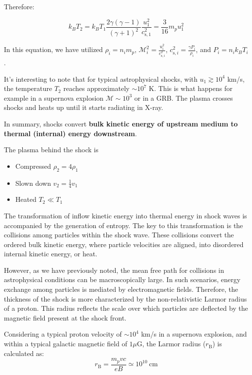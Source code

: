 Therefore:
%
\begin{remark}
\begin{equation}
k_B T_2 = k_B T_1 \frac{2 \gamma (\gamma - 1)}{(\gamma +1)^2} \frac{u_1^2}{c_{\text{s},1}^2} = \frac{3}{16} m_p u_1^2
\end{equation}
\end{remark}

In this equation, we have utilized \( \rho_i = n_i m_p \), \( \mathcal{M}_i^2 = \frac{u_i^2}{c_{\text{s},i}^2} \), \( c_{\text{s},i}^2 = \frac{\gamma P_i}{\rho_i} \), and \( P_i = n_i k_B T_i \).

It's interesting to note that for typical astrophysical shocks, with \( u_1 \gtrsim 10^4 \) km/s, the temperature \( T_2 \) reaches approximately \( \sim 10^7 \) K.
%
This is what happens for example in a supernova explosion \( \mathcal M \sim 10^3 \) or in a GRB.  The plasma crosses shocks and heats up until it starts radiating in X-ray.

In summary, shocks convert \textbf{bulk kinetic energy of upstream medium to thermal (internal) energy downstream}.

\begin{remark}
The plasma behind the shock is
\begin{itemize}
\item Compressed \( \rho_2 = 4 \rho_1 \)
\item Slown down \( v_2 = \frac{1}{4} v_1 \)
\item Heated \( T_2 \ll T_1 \)
\end{itemize}
\end{remark}

The transformation of inflow kinetic energy into thermal energy in shock waves is accompanied by the generation of entropy. The key to this transformation is the collisions among particles within the shock wave. These collisions convert the ordered bulk kinetic energy, where particle velocities are aligned, into disordered internal kinetic energy, or heat.

However, as we have previously noted, the mean free path for collisions in astrophysical conditions can be macroscopically large. In such scenarios, energy exchange among particles is mediated by electromagnetic fields.
%
Therefore, the thickness of the shock is more characterized by the non-relativistic Larmor radius of a proton. This radius reflects the scale over which particles are deflected by the magnetic field present at the shock front.

Considering a typical proton velocity of \( \sim 10^4 \) km/s in a supernova explosion, and within a typical galactic magnetic field of \( 1 \mu \)G, the Larmor radius (\( r_{\text{B}} \)) is calculated as:
%
\begin{equation}
r_{\text{B}} = \frac{m_p v c}{e B} \simeq 10^{10}~\text{cm}
\end{equation}

